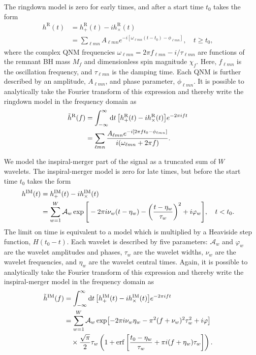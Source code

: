 The ringdown model is zero for early times, and after a start time $t_0$ takes the form
\begin{align}
	h^\mathrm{R}(t) &= h_+^\mathrm{R}(t) - ih_\times^\mathrm{R}(t) \nonumber \\
	&= \sum_{\ell m n} A_{\ell m n} e^{-i[\omega_{\ell m n}(t-t_0) - \phi_{\ell m n}]}, \quad t \geq t_0,
\end{align}
where the complex QNM frequencies $\omega_{\ell m n} = 2\pi f_{\ell m n} - i/\tau_{\ell m n}$ are functions of the remnant BH mass $M_f$ and dimensionless spin magnitude $\chi_f$. Here, $f_{\ell m n}$ is the oscillation frequency, and $\tau_{\ell m n}$ is the damping time.
Each QNM is further described by an amplitude, $A_{\ell m n}$, and phase parameter, $\phi_{\ell m n}$. 
It is possible to analytically take the Fourier transform of this expression and thereby write the ringdown model in the frequency domain as
\begin{align}
	\Tilde{h}^{\mathrm{R}}(f) &= \int_{-\infty}^\infty \dd{t} \qty[h_+^\mathrm{R}(t) - ih_\times^\mathrm{R}(t)] e^{-2\pi i f t} \nonumber \\
	&= \sum_{\ell m n} \frac{A_{\ell m n} e^{-i[2\pi ft_0 - \phi_{\ell m n}]}}{i(\omega_{\ell m n} + 2\pi f)}.
\end{align}

We model the inspiral-merger part of the signal as a truncated sum of $W$ wavelets.
The inspiral-merger model is zero for late times, but before the start time $t_0$ takes the form
\begin{align}
	h^\mathrm{IM}(t) &=  h_+^\mathrm{IM}(t) - ih_\times^\mathrm{IM}(t) \nonumber \\
	&= \sum_{w=1}^{W} \mathcal{A}_w \exp \Bigg[-2\pi i \nu_w(t-\eta_w) - \qty(\frac{t-\eta_w}{\tau_w})^2 + i\varphi_w \Bigg], \quad t < t_0.
\end{align}
The limit on time is equivalent to a model which is multiplied by a Heaviside step function, $H(t_0 - t)$. Each wavelet is described by five parameters: $\mathcal{A}_w$ and $\varphi_w$ are the wavelet amplitudes and phases, $\tau_w$ are the wavelet widths, $\nu_w$ are the wavelet frequencies, and $\eta_w$ are the wavelet central times. Again, it is possible to analytically take the Fourier transform of this expression and thereby write the inspiral-merger model in the frequency domain as
\begin{align}
	\Tilde{h}^\mathrm{IM}(f) &= \int_{-\infty}^\infty \dd{t} \qty[h_+^\mathrm{IM}(t) - ih_\times^\mathrm{IM}(t)] e^{-2\pi i f t} \\
	&= \sum_{w=1}^{W} \mathcal{A}_w \exp[-2\pi i\nu_w \eta_w -\pi^2(f+\nu_w)^2\tau_w^2 +i\varphi] \nonumber\\
	&\quad\times \frac{\sqrt{\pi}}{2}\tau_w \left(1 + \mathrm{erf} \left[ \frac{t_0-\eta_w}{\tau_w} + \pi i(f+\eta_w)\tau_w \right] \right).\nonumber
\end{align}

